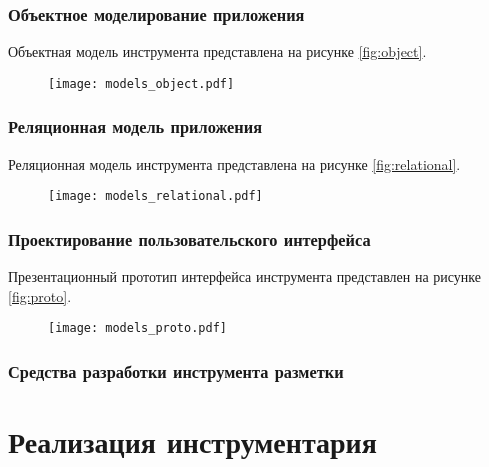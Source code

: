 \documentclass[../main]{subfiles}
\begin{document}
\subsubsection{Объектное моделирование приложения}

Объектная модель инструмента представлена на рисунке \ref{fig:object}.

\begin{figure}[H]
    \centering
    {\texttt{[image: models\_object.pdf]}}
    \vspace{-\baselineskip}
\end{figure}

\subsubsection{Реляционная модель приложения}

Реляционная модель инструмента представлена на рисунке \ref{fig:relational}.

\begin{figure}[H]
    \centering
    {\texttt{[image: models\_relational.pdf]}}
    \vspace{-\baselineskip}
\end{figure}

\subsubsection{Проектирование пользовательского интерфейса}

Презентационный прототип интерфейса инструмента представлен на рисунке \ref{fig:proto}.

\begin{figure}[H]
    \centering
    {\texttt{[image: models\_proto.pdf]}}
    \vspace{-\baselineskip}
\end{figure}

\subsubsection{Средства разработки инструмента разметки}

\newpage
\section{Реализация инструментария}
\end{document}
